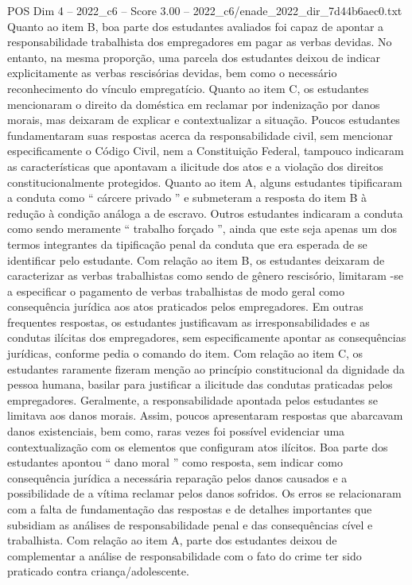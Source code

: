\begin{textsample}{POS Dim 4 – 2022\_c6 – Score 3.00 – 2022\_c6/enade\_2022\_dir\_7d44b6aec0.txt}
Quanto ao item B, boa parte dos estudantes avaliados foi capaz de apontar a responsabilidade trabalhista dos empregadores em pagar as verbas devidas.
No entanto, na mesma proporção, uma parcela dos estudantes deixou de indicar explicitamente as verbas rescisórias devidas, bem como o necessário reconhecimento do vínculo empregatício.
Quanto ao item C, os estudantes mencionaram o direito da doméstica em reclamar por indenização por danos morais, mas deixaram de explicar e contextualizar a situação.
Poucos estudantes fundamentaram suas respostas acerca da responsabilidade civil, sem mencionar especificamente o Código Civil, nem a Constituição Federal, tampouco indicaram as características que apontavam a ilicitude dos atos e a violação dos direitos constitucionalmente protegidos.
Quanto ao item A, alguns estudantes tipificaram a conduta como “ cárcere privado ” e submeteram a resposta do item B à redução à condição análoga a de escravo.
Outros estudantes indicaram a conduta como sendo meramente “ trabalho forçado ”, ainda que este seja apenas um dos termos integrantes da tipificação penal da conduta que era esperada de se identificar pelo estudante.
Com relação ao item B, os estudantes deixaram de caracterizar as verbas trabalhistas como sendo de gênero rescisório, limitaram -se a especificar o pagamento de verbas trabalhistas de modo geral como consequência jurídica aos atos praticados pelos empregadores.
Em outras frequentes respostas, os estudantes justificavam as irresponsabilidades e as condutas ilícitas dos empregadores, sem especificamente apontar as consequências jurídicas, conforme pedia o comando do item.
Com relação ao item C, os estudantes raramente fizeram menção ao princípio constitucional da dignidade da pessoa humana, basilar para justificar a ilicitude das condutas praticadas pelos empregadores.
Geralmente, a responsabilidade apontada pelos estudantes se limitava aos danos morais.
Assim, poucos apresentaram respostas que abarcavam danos existenciais, bem como, raras vezes foi possível evidenciar uma contextualização com os elementos que configuram atos ilícitos.
Boa parte dos estudantes apontou “ dano moral ” como resposta, sem indicar como consequência jurídica a necessária reparação pelos danos causados e a possibilidade de a vítima reclamar pelos danos sofridos.
Os erros se relacionaram com a falta de fundamentação das respostas e de detalhes importantes que subsidiam as análises de responsabilidade penal e das consequências cível e trabalhista.
Com relação ao item A, parte dos estudantes deixou de complementar a análise de responsabilidade com o fato do crime ter sido praticado contra criança/adolescente.

\end{textsample}
